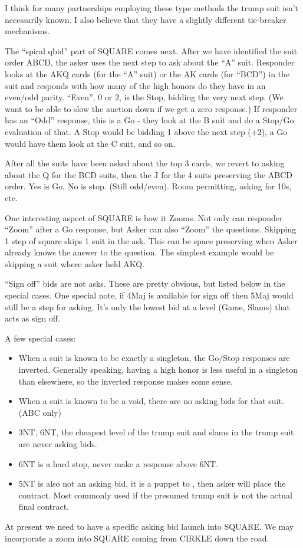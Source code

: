 \documentclass[tom-ari]{subfile}
\begin{document}
I think for many partnerships employing these type methods the trump suit isn't necessarily known.  I also believe that they have a slightly different tie-breaker mechanisms.  

The ``spiral qbid'' part of SQUARE comes next.  After we have identified the suit order ABCD, the asker uses the next step to ask about the ``A'' suit.  Responder looks at the AKQ cards (for the ``A'' suit) or the AK cards (for ``BCD'') in the suit and responds with how many of the high honors do they have in an even/odd parity.  ``Even'', 0 or 2, is the Stop, bidding the very next step.  (We want to be able to slow the auction down if we get a zero response.)  If responder has an ``Odd'' response, this is a Go - they look at the B suit and do a Stop/Go evaluation of that.  A Stop would be bidding 1 above the next step (+2), a Go would have them look at the C suit, and so on.

After all the suits have been asked about the top 3 cards, we revert to asking about the Q for the BCD suits, then the J for the 4 suits preserving the ABCD order.  Yes is Go, No is stop.  (Still odd/even).  Room permitting, asking for 10s, etc.

One interesting aspect of SQUARE is how it Zooms.  Not only can responder ``Zoom'' after a Go response, but Asker can also ``Zoom'' the questions.  Skipping 1 step of square skips 1 suit in the ask.  This can be space preserving when Asker already knows the answer to the question.  The simplest example would be skipping a suit where asker held AKQ.

``Sign off'' bids are not asks. These are pretty obvious, but listed below in the special cases.  One special note, if 4Maj is available for sign off then 5Maj would still be a step for asking.  It's only the lowest bid at a level (Game, Slams) that acts as sign off.

A few special cases:  

\begin{itemize}
	\item When a suit is known to be exactly a singleton, the Go/Stop responses are inverted.  Generally speaking, having a high honor is less useful in a singleton than elsewhere, so the inverted response makes some sense. 
	\item When a suit is known to be a void, there are no asking bids for that suit. (ABC only)
	\item 3NT, 6NT, the cheapest level of the trump suit and slams in the trump suit are never asking bids.
	\item 6NT is a hard stop, never make a response above 6NT.  
	\item 5NT is also not an asking bid, it is a puppet to , then asker will place the contract.  Most commonly used if the presumed trump suit is not the actual final contract.
\end{itemize}

At present we need to have a specific asking bid launch into SQUARE.  We may incorporate a zoom into SQUARE coming from CIRKLE down the road.
	
\end{document}
